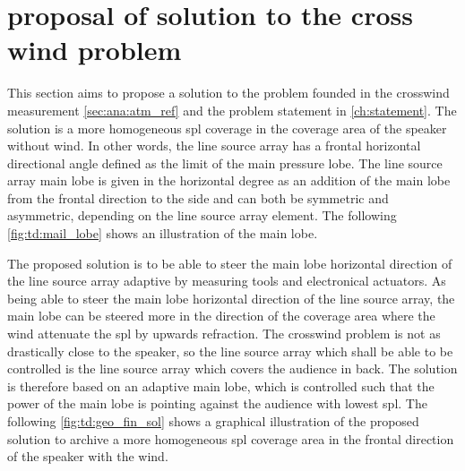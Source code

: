 \section{proposal of solution to the cross wind problem}\label{sec:td:pro_sol_pro}

This section aims to propose a solution to the problem founded in the crosswind measurement \autoref{sec:ana:atm_ref} and the problem statement in \autoref{ch:statement}. 
The solution is a more homogeneous \gls{spl} coverage in the coverage area of the speaker without wind. In other words, the line source array has a frontal horizontal directional angle defined as the  limit of the main pressure lobe. The line source array main lobe is given in the horizontal degree as an addition of the main lobe from the frontal direction to the side and can both be symmetric and asymmetric, depending on the line source array element. The following \autoref{fig:td:mail_lobe} shows an illustration of the main lobe. 


The proposed solution is to be able to steer the main lobe horizontal direction of the line source array adaptive by measuring tools and electronical actuators. 
As being able to steer the main lobe horizontal direction of the line source array, the main lobe can be steered more in the direction of the coverage area where the wind attenuate the \gls{spl} by upwards refraction.  The crosswind problem is not as drastically close to the speaker, so the line source array which shall be able to be controlled is the line source array which covers the audience in back. The solution is therefore based on an adaptive main lobe, which is controlled such that the power of the main lobe is pointing against the audience with lowest \gls{spl}. The following \autoref{fig:td:geo_fin_sol} shows a graphical illustration of the proposed solution to archive a more homogeneous \gls{spl} coverage area in the frontal direction of the speaker with the wind.


